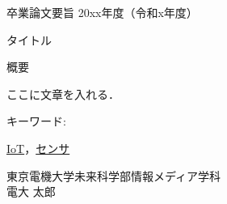 \newpage
\pagestyle{plain}
\begin{center}
\LARGE{卒業論文要旨 \hspace{10mm} 20xx年度（令和x年度）}\\

\vspace{10mm}

\LARGE{タイトル}
\end{center}

\begin{center}
概要\par
\end{center}
ここに文章を入れる．

\begin{flushleft}キーワード:\\
\end{flushleft}
{\underline{IoT}，\underline{センサ}}

\begin{center}
\vspace{10mm}
\begin{flushright}\large 東京電機大学未来科学部情報メディア学科\\
\LARGE 電大 太郎\\
\end{flushright}
\end{center}
